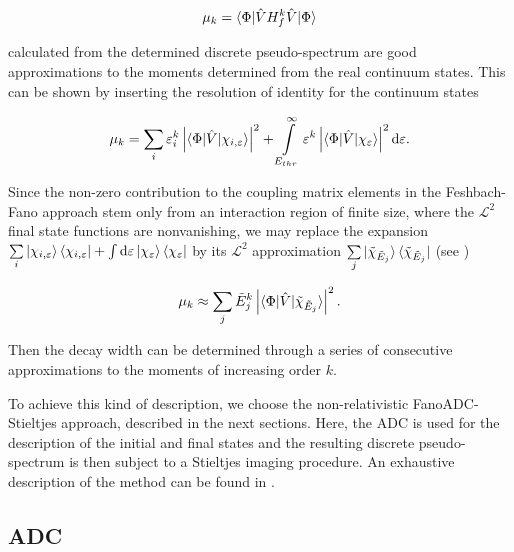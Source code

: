\begin{equation}
 \mu_k = \braket{ \Phi | \hat{V} H^k_f \hat{V} | \Phi }
\end{equation}

calculated from the determined
discrete pseudo-spectrum are good approximations to the moments determined
from the real continuum states.
This can be shown by inserting the resolution of identity for
the continuum states

\begin{equation}
 \mu_k = \sum_i \varepsilon_i^k
         \left| \braket{ \Phi | \hat{V} | \chi_{i,\varepsilon} } \right| ^2
       + \int\limits_{E_{thr}}^{\infty} \varepsilon^k
         \left| \braket{\Phi|\hat{V}|\chi_{\varepsilon}} \right|^2 \mathrm{d}\varepsilon  .
\end{equation}

Since the non-zero contribution to the coupling matrix elements in the
Feshbach-Fano approach stem only
from an interaction region of finite size, where the $\mathcal{L}^2$ final
state functions are nonvanishing, we may replace the expansion
$\sum\limits_i \ket{\chi_{i,\varepsilon}} \bra{\chi_{i,\varepsilon}}
 + \int \mathrm{d}\varepsilon \ket{\chi_\varepsilon} \bra{\chi_\varepsilon}$
by its $\mathcal{L}^2$ approximation
$\sum\limits_j \ket{\tilde{\chi}_{\tilde{E}_j}} \bra{\tilde{\chi}_{\tilde{E}_j}}$
(see \cite{Reinhardt79})

\begin{equation}
 \label{eq:moment_discrete}
 \mu_k \approx \sum\limits_j \tilde{E}_j ^k
         \left| \braket{\Phi|\hat{V}|\tilde{\chi}_{\tilde{E}_j}}  \right|^2 .
\end{equation}

Then the decay width can be determined through a series of
consecutive approximations to the moments of increasing order $k$.

To achieve this kind of description, we choose the non-relativistic
FanoADC-Stieltjes approach, described
in the next sections. Here, the ADC is used for the description of the
initial and final states and the resulting discrete pseudo-spectrum
is then subject to a Stieltjes imaging procedure.
An exhaustive description of the method can be found in \cite{Fasshauer_thesis}.

\subsection{ADC}

\label{section:adc}

